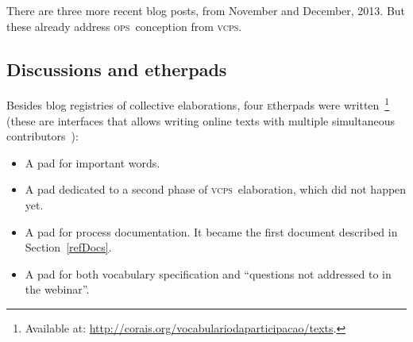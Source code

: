 \documentclass[10pt,letterpaper]{article}
\newcommand{\ops}{\textsc{ops}}
\newcommand{\vcps}{\textsc{vcps}}
\newcommand{\etherpad}{\textsc{e}therpad}
\begin{document}
There are three more recent blog posts, from November and December, 2013.
But these already address \ops\ conception from \vcps.

\subsection{Discussions and etherpads}
Besides blog registries of collective elaborations, four \etherpad s
were written~\footnote{Available at: \url{http://corais.org/vocabulariodaparticipacao/texts}.} 
(these are interfaces that allows writing online texts with multiple simultaneous contributors~\cite{etherpads2}):
\begin{itemize}
    \item A pad for important words.
    \item A pad dedicated to a second phase of \vcps\ elaboration, which did not happen yet.
    \item A pad for process documentation. It became the first document described in Section~\ref{refDocs}. 
    \item A pad for both vocabulary specification and ``questions not addressed to in the webinar''.
\end{itemize}
 


\end{document}
